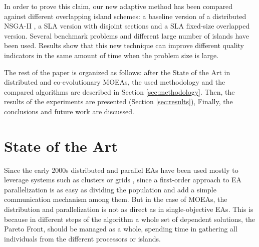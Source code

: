 \documentclass[preprint]{elsarticle}
\begin{document}
In order to prove this claim, our new adaptive method has been
compared against different overlapping island schemes: a
baseline version of a distributed NSGA-II \citep{Deb00NSGAII}, a
SLA version with disjoint sections and a SLA
fixed-size overlapped version. %
Several benchmark problems and different large number of islands
have been used. Results show that this new technique can improve
different quality indicators in the same amount of time when the
problem size is large.  %

The rest of the paper is organized as follows: after the State of the Art in distributed and co-evolutionary MOEAs, 
the used methodology and the compared algorithms are described in Section \ref{sec:methodology}. 
Then, the results of the experiments are presented (Section \ref{sec:results}), Finally, the conclusions and future work are discussed.


%
\section{State of the Art}
\label{sec:soa}





Since the early 2000s distributed and parallel EAs
 have been used mostly to leverage systems such
as clusters or grids \citep{Talbi08Parallel}, since a first-order
approach to EA parallelization is as easy as dividing the population
and add a simple communication mechanism among them. But in the case of
MOEAs, the distribution and parallelization is not as direct as in
single-objective EAs. This is because in different steps of the
algorithm a whole set of dependent solutions, the Pareto Front, should
be managed as a whole, spending time in gathering all individuals from
the different processors or islands. 
\end{document}
